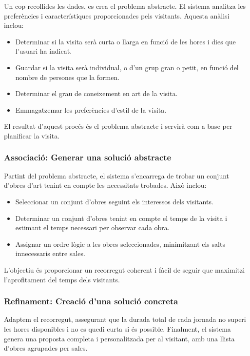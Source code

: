 \documentclass[a4paper]{article}
\begin{document}
	Un cop recollides les dades, es crea el problema abstracte. El sistema analitza les preferències i característiques proporcionades pels visitants. Aquesta anàlisi inclou:
	\begin{itemize}
		\item Determinar si la visita serà curta o llarga en funció de les hores i dies que l'usuari ha indicat.
		\item Guardar si la visita serà individual, o d'un grup gran o petit, en funció del nombre de persones que la formen.
		\item Determinar el grau de coneixement en art de la visita.
		\item Emmagatzemar les preferències d'estil de la visita.
	\end{itemize}
	
	El resultat d’aquest procés és el problema abstracte i servirà com a base per planificar la visita.
	
	
	\subsubsection{Associació: Generar una solució abstracte}

	Partint del problema abstracte, el sistema s’encarrega de trobar un conjunt d'obres d'art tenint en compte les necessitats trobades. Això inclou:
	\begin{itemize}
		\item Seleccionar un conjunt d'obres seguint els interessos dels visitants.
		\item Determinar un conjunt d'obres tenint en compte el temps de la visita i estimant el temps necessari per observar cada obra.
		\item Assignar un ordre lògic a les obres seleccionades, minimitzant els salts innecessaris entre sales.
	\end{itemize}
	
	L’objectiu és proporcionar un recorregut coherent i fàcil de seguir que maximitzi l’aprofitament del temps dels visitants.
	
	\subsubsection{Refinament: Creació d'una solució concreta}
	
	Adaptem el recorregut, assegurant que la durada total de cada jornada no superi les hores disponibles i no es quedi curta si és possible. Finalment, el sistema genera una proposta completa i personalitzada per al visitant, amb una llista d'obres agrupades per sales. \\
	
\end{document}
